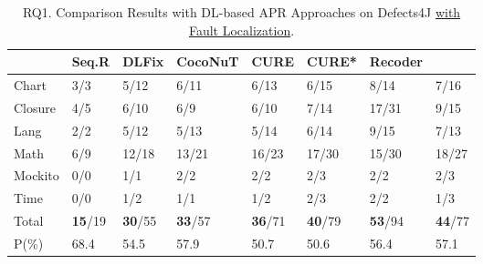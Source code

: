 



\begin{table}[t]
  \caption{RQ1. Comparison Results with DL-based APR Approaches on Defects4J \underline {with Fault Localization}.}
  \vspace{-6pt}
         {\footnotesize
        \tabcolsep 3.5pt
			\begin{center}
				\renewcommand{\arraystretch}{1}
				\begin{tabular}{p{0.8cm}<{\centering}|p{0.8cm}<{\centering}|p{0.9cm}<{\centering}|p{1cm}<{\centering}|p{0.8cm}<{\centering}|p{0.8cm}<{\centering}|p{1.0cm}<{\centering}|p{0.8cm}<{\centering}}
					
					\hline
					&\textbf{Seq.R}&\textbf{DLFix}& \textbf{CocoNuT}&\textbf{CURE}&\textbf{CURE*}& {\bf Recoder} &\textbf{\tool}\\
					\hline
					Chart  & 3/3   & 5/12  & 6/11  & 6/13  & 6/15 & 8/14 & 7/16\\
					Closure& 4/5   & 6/10  & 6/9   & 6/10  & 7/14 & 17/31 & 9/15\\
					Lang   & 2/2   & 5/12  & 5/13  & 5/14  & 6/14  & 9/15 & 7/13\\
					Math    & 6/9  & 12/18 & 13/21 & 16/23 & 17/30 & 15/30 & 18/27\\
					Mockito & 0/0   & 1/1   & 2/2   & 2/2  & 2/3  & 2/2 & 2/3\\
					Time    & 0/0   & 1/2   & 1/1   & 1/2  & 2/3 & 2/2 & 1/3\\
					\hline
					Total   & {\bf 15}/19 & {\bf 30}/55 & {\bf 33}/57 & {\bf 36}/71 & {\bf 40}/79 & {\bf 53}/94 & {\bf 44}/77\\
					\hline
					P(\%)  & 68.4  & 54.5  & 57.9  & 50.7  & 50.6 & 56.4 & 57.1\\
					\hline
				\end{tabular}
				\label{RQ1_defects4J_with_FL}
			\end{center}
                }
		\end{table}

















